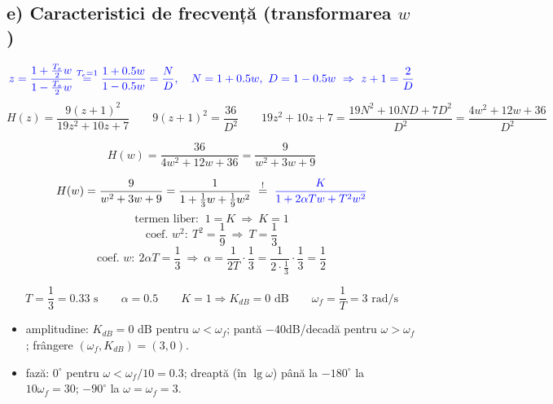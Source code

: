 \documentclass[10pt,a4paper]{article}
\begin{document}
\begin{center}
\end{center}

\subsection*{e) Caracteristici de frecvență (transformarea $w$)}
$$\color{blue}z=\frac{1+\frac{T_e}2w}{1-\frac{T_e}2w}\overset{T_e=1}{=}\frac{1+0.5w}{1-0.5w}=\frac ND,\quad N=1+0.5w,\ D=1-0.5w\ \Rightarrow\ z+1=\frac2D$$
$$H(z)=\frac{9(z+1)^2}{19z^2+10z+7}\qquad
9(z+1)^2=\frac{36}{D^2}\qquad
19z^2+10z+7=\frac{19N^2+10ND+7D^2}{D^2}=\frac{4w^2+12w+36}{D^2}$$
\begin{res}
$$H(w)=\frac{36}{4w^2+12w+36}=\frac9{w^2+3w+9}$$
\end{res}
$$H(w)=\frac9{w^2+3w+9}=\frac1{1+\frac13w+\frac19w^2}\ \overset{!}{=}\ \textcolor{blue}{\frac{K}{1+2\alpha Tw+T^2w^2}}$$
$$\text{termen liber: }\ 1=K\ \Rightarrow\ K=1$$
$$\text{coef. }w^2:\ T^2=\frac19\ \Rightarrow\ T=\frac13$$
$$\text{coef. }w:\ 2\alpha T=\frac13\ \Rightarrow\ \alpha=\frac1{2T}\cdot\frac13=\frac1{2\cdot\frac13}\cdot\frac13=\frac12$$
\begin{res}
$$T=\frac13=0.33\text{ s}\qquad \alpha=0.5\qquad K=1\Rightarrow K_{dB}=0\text{ dB}\qquad \omega_f=\frac1T=3\text{ rad/s}$$
\end{res}
\begin{itemize}
\item amplitudine: $K_{dB}=0$ dB pentru $\omega<\omega_f$; pantă $-40$dB/decadă pentru $\omega>\omega_f$; frângere $(\omega_f,K_{dB})=(3,0)$.
\item fază: $0^\circ$ pentru $\omega<\omega_f/10=0.3$; dreaptă (în $\lg\omega$) până la $-180^\circ$ la $10\omega_f=30$; $-90^\circ$ la $\omega=\omega_f=3$.
\end{itemize}
\end{document}
